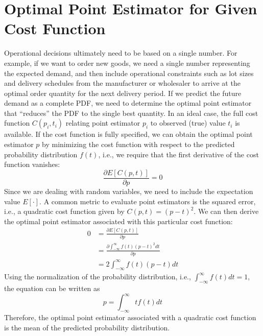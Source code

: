 \documentclass[BCOR=1mm, DIV=calc,10pt,
twoside=true,
twocolumn,
headings=normal]{scrartcl}
\begin{document}





\appendix

\section{Optimal Point Estimator for Given Cost Function}
\label{sec:CostQuantile}

Operational decisions ultimately need to be based on a single number. For example, if we want to order new goods, we need a single number representing the expected demand, and then include operational constraints such as lot sizes and delivery schedules from the manufacturer or wholesaler to arrive at the optimal order quantity for the next delivery period. If we predict the future demand as a complete PDF, we need to determine the optimal point estimator that ``reduces'' the PDF to the single best quantity. In an ideal case, the full cost function $C(p_i,t_i)$ relating point estimator $p_i$ to observed (true) value $t_i$ is available. If the cost function is fully specified, we can obtain the optimal point estimator $p$ by minimizing the cost function with respect to the predicted probability distribution $f(t)$, i.e., we require that the first derivative of the cost function vanishes:
\begin{equation}
	\frac{\partial E[C(p,t)]}{\partial p} = 0
\end{equation}
Since we are dealing with random variables, we need to include the expectation value $E[\cdot]$. A common metric to evaluate point estimators is the squared error, i.e., a quadratic cost function given by $C(p,t) = (p-t)^2$. We can then derive the optimal point estimator associated with this particular cost function:
\begin{align*}
0 &= \frac{\partial E[C(p,t)]}{\partial p}   \\
  &= \frac{\partial \int_{-\infty}^\infty  f(t) (p-t)^2 dt}{\partial p}  \\
 &= 2 \int_{-\infty}^\infty  f(t) (p-t) dt
\end{align*}
Using the normalization of the probability distribution, i.e., $\int_{-\infty}^\infty  f(t) dt = 1$, the equation can be written as 
\begin{equation}
p = \int_{-\infty}^\infty  t f(t) dt
\end{equation}
Therefore, the optimal point estimator associated with a quadratic cost function is the mean of the predicted probability distribution.
\end{document}
